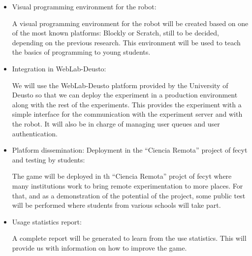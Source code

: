 \begin{itemize}
\item Visual programming environment for the robot:

A visual programming environment for the robot will be created based on one of the most known
platforms: Blockly or Scratch, still to be decided, depending on the previous research. This
environment will be used to teach the basics of programming to young students.

\item Integration in WebLab-Deusto:

We will use the WebLab-Deusto platform provided by the University of Deusto so that we can deploy
the experiment in a production environment along with the rest of the experiments. This provides the
experiment with a simple interface for the communication with the experiment server and with the
robot. It will also be in charge of managing user queues and user authentication.

\item Platform dissemination: Deployment in the ``Ciencia Remota'' project of \acrshort{fecyt} and
testing by students:

The game will be deployed in th ``Ciencia Remota'' projct of \acrshort{fecyt} where many
institutions work to bring remote experimentation to more places. For that, and as a demonstration
of the potential of the project, some public test will be performed where students from various
schools will take part.

\item Usage statistics report:

A complete report will be generated to learn from the use statistics. This will provide us with
information on how to improve the game.

\end{itemize}
